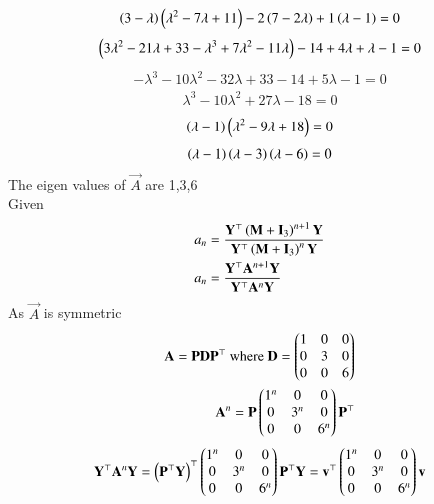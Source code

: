 \documentclass[journal]{IEEEtran}
\begin{document}
 \vspace{-0.7cm} 
 \begin{align}
 \left(3-\lambda\right)\left(\lambda^2-7\lambda+11\right)-2\left(7-2\lambda\right)+1\left(\lambda-1\right)=0 
 \end{align}
 \vspace{-0.7cm} 
 \begin{align}
 \left(3\lambda^2-21\lambda+33-\lambda^3+7\lambda^2-11\lambda\right)-14+4\lambda+\lambda-1=0
 \end{align}
 \vspace{-0.7cm}
 \begin{align}
 -\lambda^3-10\lambda^2-32\lambda+33-14+5\lambda-1=0 
 \end{align}
 \vspace{-0.7cm}
 \begin{align}
 \lambda^3-10\lambda^2+27\lambda-18=0 
\end{align}
\vspace{-0.7cm}
\begin{align}
    \left(\lambda-1\right)\left(\lambda^2-9\lambda+18\right)=0
\end{align}
\vspace{-0.7cm}
\begin{align}
    \left(\lambda-1\right)\left(\lambda-3\right)\left(\lambda-6\right)=0
\end{align}
The eigen values of $\vec{A}$ are 1,3,6 \\
Given
\begin{align}
a_n&=\frac{\mathbf{Y}^\top\left(\mathbf{M}+\mathbf{I}_3\right)^{n+1}\mathbf{Y}}{\mathbf{Y}^\top\left(\mathbf{M}+\mathbf{I}_3\right)^{n}\mathbf{Y}} \\
    a_n&=\frac{\mathbf{Y}^\top\mathbf{A}^{n+1}\mathbf{Y}}{\mathbf{Y}^\top\mathbf{A}^{n}\mathbf{Y}}
\end{align}
As $\vec{A}$ is symmetric
\begin{align}
    \vec{A}=\vec{P}\vec{D}\vec{P}^\top\ \text{where}\ \vec{D}=\myvec{1&0&0\\0&3&0\\0&0&6} \\
\vec{A}^n=\vec{P}\myvec{1^n&0&0\\0&3^n&0\\0&0&6^n}\vec{P}^\top 
\end{align}
\begin{align}
\mathbf{Y}^\top\mathbf{A}^n\mathbf{Y}=\left(\mathbf{P^\top}\mathbf{Y}\right)^\top \begin{pmatrix}1^n&0&0\\0&3^n&0\\0&0&6^n\end{pmatrix}\mathbf{P}^\top\mathbf{Y}=\mathbf{v}^\top\begin{pmatrix}1^n&0&0\\0&3^n&0\\0&0&6^n\end{pmatrix}\mathbf{v}
\end{align}
\end{document}
